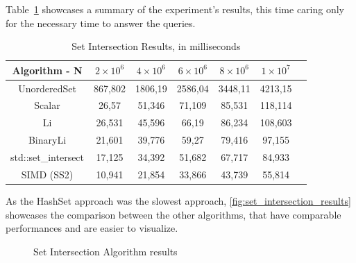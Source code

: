 Table~\ref{tab:setresults} showcases a summary of the experiment's results, this time caring only for the necessary time to answer the queries.

\begin{table}[!ht]
  \begin{center}
    \caption{Set Intersection Results, in milliseconds}\label{tab:setresults}
    \begin{tabular}{|c|c|c|c|c|c|c|}
      \hline
      \textbf{Algorithm - N} & \bfseries $2\times10^6$ & \bfseries $4\times10^6$ & \bfseries $6\times10^6$ & \bfseries $8\times10^6$ & \bfseries $1\times10^7$\\
      \hline
      UnorderedSet & 867,802 & 1806,19 & 2586,04 & 3448,11 & 4213,15\\
      \hline
      Scalar & 26,57 & 51,346 & 71,109 & 85,531 & 118,114\\
      \hline
      Li & 26,531 & 45,596 & 66,19 & 86,234 & 108,603\\
      \hline
      BinaryLi & 21,601 & 39,776 & 59,27 & 79,416 & 97,155\\
      \hline
      std::set\_intersect & 17,125 & 34,392 & 51,682 & 67,717 & 84,933\\
      \hline
      SIMD (SS2) & 10,941 & 21,854 & 33,866 & 43,739 & 55,814\\
      \hline
    \end{tabular}
  \end{center}
\end{table}

As the HashSet approach was the slowest approach, \autoref{fig:set_intersection_results} showcases the comparison between the other algorithms, that have comparable performances and are easier to visualize.

\begin{figure}[ht]
  \caption{Set Intersection Algorithm results}\label{fig:set_intersection_results}
  \vspace{6mm}
  \begin{center}
  \end{center}
  \vspace{2mm}
\end{figure}

